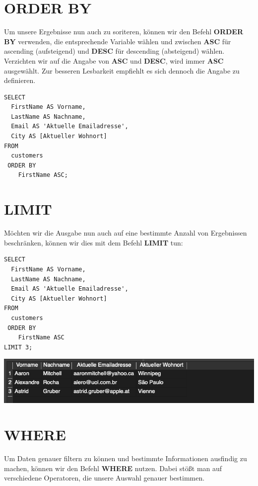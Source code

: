 \documentclass[
]{book}
\begin{document}
\hypertarget{order-by}{%
\section{ORDER BY}\label{order-by}}

Um unsere Ergebnisse nun auch zu soriteren, können wir den Befehl \textbf{ORDER BY} verwenden, die entsprechende Variable wählen und zwischen \textbf{ASC} für ascending (aufsteigend) und \textbf{DESC} für descending (absteigend) wählen. Verzichten wir auf die Angabe von \textbf{ASC} und \textbf{DESC}, wird immer \textbf{ASC} ausgewählt. Zur besseren Lesbarkeit empfiehlt es sich dennoch die Angabe zu definieren.

\begin{verbatim}
SELECT
  FirstName AS Vorname,
  LastName AS Nachname,
  Email AS 'Aktuelle Emailadresse',
  City AS [Aktueller Wohnort]
FROM
  customers
 ORDER BY
    FirstName ASC;
\end{verbatim}

\hypertarget{limit}{%
\section{LIMIT}\label{limit}}

Möchten wir die Ausgabe nun auch auf eine bestimmte Anzahl von Ergebnissen beschränken, können wir dies mit dem Befehl \textbf{LIMIT} tun:

\begin{verbatim}
SELECT
  FirstName AS Vorname,
  LastName AS Nachname,
  Email AS 'Aktuelle Emailadresse',
  City AS [Aktueller Wohnort]
FROM
  customers
 ORDER BY
    FirstName ASC
LIMIT 3;
\end{verbatim}

\includegraphics[width=10.41667in,height=\textheight]{img-SELECT6.png}

\hypertarget{where}{%
\section{WHERE}\label{where}}

Um Daten genauer filtern zu können und bestimmte Informationen ausfindig zu machen, können wir den Befehl \textbf{WHERE} nutzen. Dabei stößt man auf verschiedene Operatoren, die unsere Auswahl genauer bestimmen.
\end{document}
